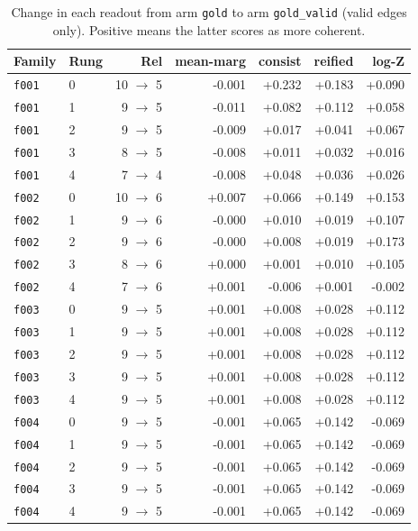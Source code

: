 \documentclass[11pt]{article}
\begin{document}
\begin{table}[htbp]
\centering
\small
\caption{Change in each readout from arm \texttt{gold} to arm \texttt{gold\_valid} (valid edges only). Positive means the latter scores as more coherent.}
\label{tab:arm-delta-gold-gold-valid}
\begin{tabular}{llrrrrr}
\toprule
Family & Rung & Rel & \textbf{mean-marg} & \textbf{consist} & \textbf{reified} & \textbf{log-Z} \\
\midrule
\texttt{f001} & 0 & 10 $\to$ 5 & -0.001 & +0.232 & +0.183 & +0.090 \\
\texttt{f001} & 1 & 9 $\to$ 5 & -0.011 & +0.082 & +0.112 & +0.058 \\
\texttt{f001} & 2 & 9 $\to$ 5 & -0.009 & +0.017 & +0.041 & +0.067 \\
\texttt{f001} & 3 & 8 $\to$ 5 & -0.008 & +0.011 & +0.032 & +0.016 \\
\texttt{f001} & 4 & 7 $\to$ 4 & -0.008 & +0.048 & +0.036 & +0.026 \\
\texttt{f002} & 0 & 10 $\to$ 6 & +0.007 & +0.066 & +0.149 & +0.153 \\
\texttt{f002} & 1 & 9 $\to$ 6 & -0.000 & +0.010 & +0.019 & +0.107 \\
\texttt{f002} & 2 & 9 $\to$ 6 & -0.000 & +0.008 & +0.019 & +0.173 \\
\texttt{f002} & 3 & 8 $\to$ 6 & +0.000 & +0.001 & +0.010 & +0.105 \\
\texttt{f002} & 4 & 7 $\to$ 6 & +0.001 & -0.006 & +0.001 & -0.002 \\
\texttt{f003} & 0 & 9 $\to$ 5 & +0.001 & +0.008 & +0.028 & +0.112 \\
\texttt{f003} & 1 & 9 $\to$ 5 & +0.001 & +0.008 & +0.028 & +0.112 \\
\texttt{f003} & 2 & 9 $\to$ 5 & +0.001 & +0.008 & +0.028 & +0.112 \\
\texttt{f003} & 3 & 9 $\to$ 5 & +0.001 & +0.008 & +0.028 & +0.112 \\
\texttt{f003} & 4 & 9 $\to$ 5 & +0.001 & +0.008 & +0.028 & +0.112 \\
\texttt{f004} & 0 & 9 $\to$ 5 & -0.001 & +0.065 & +0.142 & -0.069 \\
\texttt{f004} & 1 & 9 $\to$ 5 & -0.001 & +0.065 & +0.142 & -0.069 \\
\texttt{f004} & 2 & 9 $\to$ 5 & -0.001 & +0.065 & +0.142 & -0.069 \\
\texttt{f004} & 3 & 9 $\to$ 5 & -0.001 & +0.065 & +0.142 & -0.069 \\
\texttt{f004} & 4 & 9 $\to$ 5 & -0.001 & +0.065 & +0.142 & -0.069 \\

\end{tabular}
\end{table}
\end{document}

